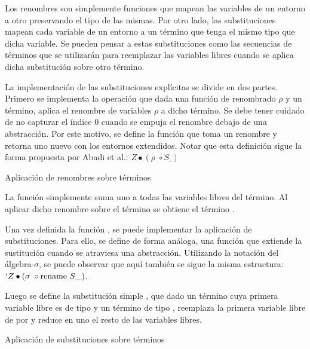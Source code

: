 
Los renombres son simplemente funciones que mapean las variables de un entorno a otro preservando el tipo de las mismas.
Por otro lado, las substituciones mapean cada variable de un entorno a un término que tenga el mismo tipo que dicha variable.
Se pueden pensar a estas substituciones como las secuencias de términos que se utilizarán para reemplazar las variables libres cuando se aplica dicha substitución sobre otro término. 

La implementación de las substituciones explícitas se divide en dos partes.
Primero se implementa la operación  que dada una función de renombrado $\rho$ y un término, aplica el renombre de variables $\rho$ a dicho término.
Se debe tener cuidado de no capturar el índice 0 cuando se empuja el renombre debajo de una abstracción.
Por este motivo, se define la función  que toma un renombre y retorna uno nuevo con los entornos extendidos.
Notar que esta definición sigue la forma propuesta por Abadi et al.: $Z \bullet (\rho \; \circ S\_)$

\begin{codigo}
	Aplicación de renombres sobre términos
\end{codigo}

\begin{example}
	La función   simplemente suma uno a todas las variables libres del término.
	Al aplicar dicho renombre sobre el término  se obtiene el término .
	
\end{example}

Una vez definida la función , se puede implementar la aplicación de substituciones.
Para ello, se define de forma análoga, una función  que extiende la sustitución cuando se atraviesa una abstracción.
Utilizando la notación del álgebra-$\sigma$, se puede observar que aquí también se sigue la misma estructura: $`Z \bullet (\sigma \; \circ \text{rename } S\_)$.

Luego se define la substitución simple \func{$\_[\_]$}, que dado un término  cuya primera variable libre es de tipo  y un término  de tipo , reemplaza la primera variable libre de  por  y reduce en uno el resto de las variables libres.

\begin{codigo}
	Aplicación de substituciones sobre términos
\end{codigo}

